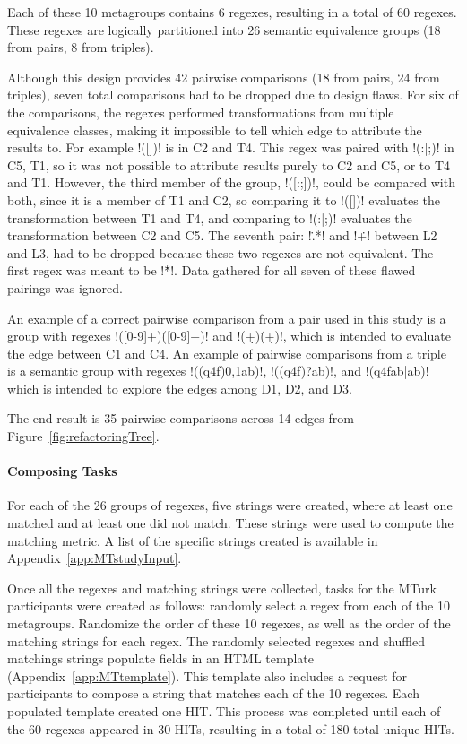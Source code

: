 Each of these 10 metagroups contains 6 regexes, resulting in a total of 60 regexes.  These regexes are logically partitioned into 26 semantic equivalence groups (18 from pairs, 8 from triples).

Although this design provides 42 pairwise comparisons (18 from pairs, 24 from triples),  seven total comparisons had to be dropped due to design flaws.  For six of the comparisons, the regexes performed transformations from multiple equivalence classes, making it impossible to tell which edge to attribute the results to. For example \cverb!([])! is in C2 and T4.  This regex was paired with \cverb!(:|;)! in C5, T1, so it was not possible to attribute results purely to C2 and C5, or to T4 and T1. However, the third member of the group, \cverb!([:;])!, could be compared with both, since it is a member of T1 and C2, so comparing it to \cverb!([])! evaluates the transformation between T1 and T4, and comparing to \cverb!(:|;)! evaluates the transformation between C2 and C5.  The seventh pair: \cverb!\..*! and \cverb!\.+! between L2 and L3, had to be dropped because these two regexes are not equivalent.  The first regex was meant to be \cverb!\.\.*!.  Data gathered for all seven of these flawed pairings was ignored.

An example of a correct pairwise comparison from a pair used in this study is a group with regexes \cverb!([0-9]+)\.([0-9]+)! and  \cverb!(\d+)\.(\d+)!, which is intended to evaluate the edge between C1 and C4.
An example of pairwise comparisons from a triple is a semantic group with regexes \cverb!((q4f){0,1}ab)!, \cverb!((q4f)?ab)!, and \cverb!(q4fab|ab)! which is intended to explore the edges among D1, D2, and D3.

The end result is 35 pairwise comparisons across 14 edges from Figure~\ref{fig:refactoringTree}.

\paragraph{Composing Tasks}
For each of the 26 groups of regexes, five strings were created, where at least one matched and at least one did not match. These strings were used to compute the matching metric. A list of the specific strings created is available in Appendix~\ref{app:MTstudyInput}.

Once all the regexes and matching strings were collected, tasks for the MTurk participants were created as follows: randomly select a regex from each of the 10 metagroups. Randomize the order of these 10 regexes, as well as the order of the matching strings for each regex. The randomly selected regexes and shuffled matchings strings populate fields in an HTML template (Appendix~\ref{app:MTtemplate}).  This template also includes a request for participants to compose a string that matches each of the 10 regexes.  Each populated template created one HIT.
This process was completed until each of the 60 regexes appeared in 30 HITs, resulting in a total of 180 total unique HITs.

